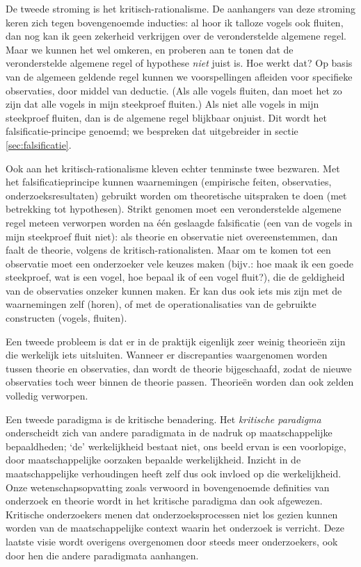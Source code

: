 \documentclass[
]{book}
\begin{document}
De tweede stroming is het kritisch-rationalisme. De aanhangers van deze
stroming keren zich tegen bovengenoemde inducties: al hoor ik talloze
vogels ook fluiten, dan nog kan ik geen zekerheid verkrijgen over de
veronderstelde algemene regel. Maar we kunnen het wel omkeren, en
proberen aan te tonen dat de veronderstelde algemene regel of hypothese \emph{niet} juist is. Hoe werkt dat? Op basis van de algemeen geldende regel
kunnen we voorspellingen afleiden voor specifieke observaties, door
middel van deductie. (Als alle vogels fluiten, dan moet het zo zijn dat
alle vogels in mijn steekproef fluiten.) Als niet alle vogels in mijn
steekproef fluiten, dan is de algemene regel blijkbaar onjuist. Dit
wordt het falsificatie-principe genoemd; we bespreken dat uitgebreider
in sectie \ref{sec:falsificatie}.

Ook aan het kritisch-rationalisme kleven echter tenminste twee bezwaren.
Met het falsificatieprincipe kunnen waarnemingen (empirische feiten,
observaties, onderzoeksresultaten) gebruikt worden om theoretische
uitspraken te doen (met betrekking tot hypothesen). Strikt genomen moet
een veronderstelde algemene regel meteen verworpen worden na één
geslaagde falsificatie (een van de vogels in mijn steekproef fluit
niet): als theorie en observatie niet overeenstemmen, dan faalt de
theorie, volgens de kritisch-rationalisten. Maar om te komen tot een
observatie moet een onderzoeker vele keuzes maken (bijv.: hoe maak ik
een goede steekproef, wat is een vogel, hoe bepaal ik of een vogel
fluit?), die de geldigheid van de observaties onzeker kunnen maken. Er
kan dus ook iets mis zijn met de waarnemingen zelf (horen), of met de
operationalisaties van de gebruikte constructen (vogels, fluiten).

Een tweede probleem is dat er in de praktijk eigenlijk zeer weinig
theorieën zijn die werkelijk iets uitsluiten. Wanneer er discrepanties
waargenomen worden tussen theorie en observaties, dan wordt de theorie
bijgeschaafd, zodat de nieuwe observaties toch weer binnen de theorie
passen. Theorieën worden dan ook zelden volledig verworpen.

Een tweede paradigma is de kritische benadering. Het \emph{kritische paradigma}
onderscheidt zich van andere paradigmata in de nadruk op
maatschappelijke bepaaldheden; `de' werkelijkheid bestaat niet, ons
beeld ervan is een voorlopige, door maatschappelijke oorzaken bepaalde
werkelijkheid. Inzicht in de maatschappelijke verhoudingen heeft zelf
dus ook invloed op die werkelijkheid. Onze wetenschapsopvatting zoals
verwoord in bovengenoemde definities van onderzoek en theorie wordt in
het kritische paradigma dan ook afgewezen. Kritische onderzoekers menen
dat onderzoeksprocessen niet los gezien kunnen worden van de
maatschappelijke context waarin het onderzoek is verricht. Deze laatste
visie wordt overigens overgenomen door steeds meer onderzoekers, ook
door hen die andere paradigmata aanhangen.
\end{document}
